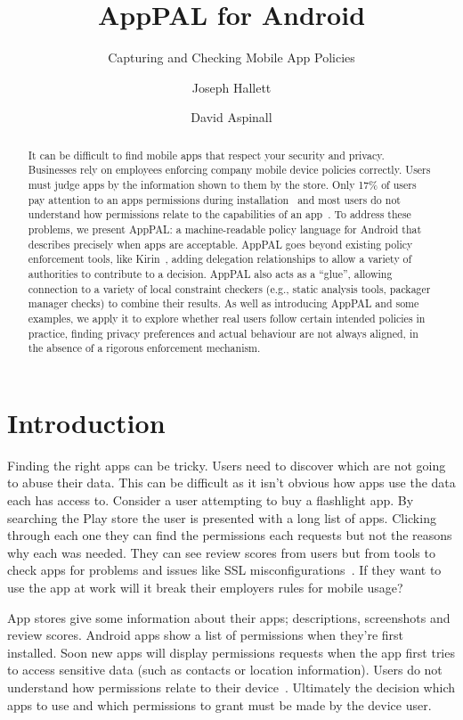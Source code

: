 \documentclass[]{llncs}
\title{AppPAL for Android}
\subtitle{Capturing and Checking Mobile App Policies}
\author{Joseph Hallett \and David Aspinall }
\institute{School of Informatics, University of Edinburgh}
\begin{document}
\maketitle{}

\begin{abstract}
  It can be difficult to find mobile apps that respect your security and privacy.
  Businesses rely on employees enforcing company mobile device policies correctly.
  Users must judge apps by the information shown to them by the store.
  Only 17\% of users pay attention to an apps permissions during installation~\cite{Felt:2012hm} and most users do not understand how permissions relate to the capabilities of an app~\cite{Kelley:2012bw}.
  To address these problems, we present AppPAL: a machine-readable policy language for Android that describes precisely when apps are acceptable.
  AppPAL goes beyond existing policy enforcement tools, like Kirin~\cite{Enck:2008vn}, adding delegation relationships to allow a variety of authorities to contribute to a decision.
  AppPAL also acts as a ``glue'', allowing connection to a variety of local constraint checkers (e.g., static analysis tools, packager manager checks) to combine their results.
  As well as introducing AppPAL and some examples, we apply it to explore whether real users follow certain intended policies in practice, finding privacy preferences and actual behaviour are not always aligned, in the absence of a rigorous enforcement mechanism.
  \end{abstract}

\section{Introduction}
\label{sec:introduction}

Finding the right apps can be tricky.
Users need to discover which are not going to abuse their data.
This can be difficult as it isn't obvious how apps use the data each has access to.
Consider a user attempting to buy a flashlight app.
By searching the Play store the user is presented with a long list of apps.
Clicking through each one they can find the permissions each requests but not the reasons why each was needed.
They can see review scores from users but from tools to check apps for problems and issues like SSL misconfigurations~\cite{Fahl:2012dj}.
If they want to use the app at work will it break their employers rules for mobile usage?

App stores give some information about their apps; descriptions, screenshots and review scores.
Android apps show a list of permissions when they're first installed.
Soon new apps will display permissions requests when the app first tries to access sensitive data (such as contacts or location information).
Users do not understand how permissions relate to their device~\cite{Felt:2012hm,Thompson:2013eb}.
Ultimately the decision which apps to use and which permissions to grant must be made by the device user.
\end{document}
